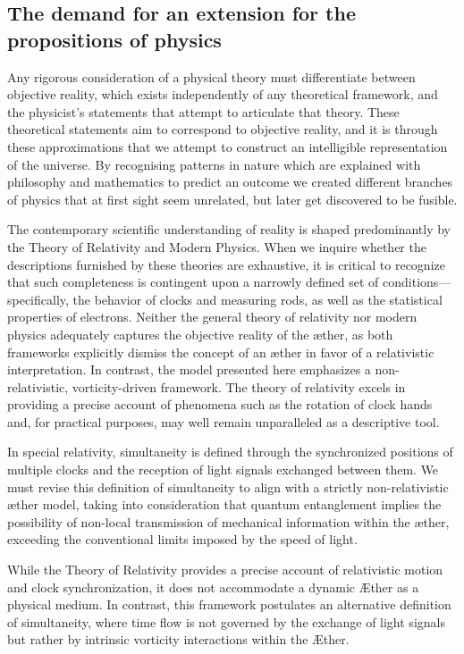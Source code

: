 \subsection{The demand for an extension for the propositions of physics}\label{subsec:introduction}

Any rigorous consideration of a physical theory must differentiate between objective reality, which exists independently of any theoretical framework, and the physicist's statements that attempt to articulate that theory.
These theoretical statements aim to correspond to objective reality, and it is through these approximations that we attempt to construct an intelligible representation of the universe.
By recognising patterns in nature which are explained with philosophy and mathematics to predict an outcome we created different branches of physics that at first sight seem unrelated, but later get discovered to be fusible.

The contemporary scientific understanding of reality is shaped predominantly by the Theory of Relativity and Modern Physics.
When we inquire whether the descriptions furnished by these theories are exhaustive, it is critical to recognize that such completeness is contingent upon a narrowly defined set of conditions—specifically, the behavior of clocks and measuring rods, as well as the statistical properties of electrons.
Neither the general theory of relativity nor modern physics adequately captures the objective reality of the \ae ther, as both frameworks explicitly dismiss the concept of an \ae ther in favor of a relativistic interpretation.
In contrast, the model presented here emphasizes a non-relativistic, vorticity-driven framework.
The theory of relativity excels in providing a precise account of phenomena such as the rotation of clock hands and, for practical purposes, may well remain unparalleled as a descriptive tool.

In special relativity, simultaneity is defined through the synchronized positions of multiple clocks and the reception of light signals exchanged between them.
We must revise this definition of simultaneity to align with a strictly non-relativistic \ae ther model, taking into consideration that quantum entanglement implies the possibility of non-local transmission of mechanical information within the \ae ther, exceeding the conventional limits imposed by the speed of light.

While the Theory of Relativity provides a precise account of relativistic motion and clock synchronization, it does not accommodate a dynamic \AE ther as a physical medium.
In contrast, this framework postulates an alternative definition of simultaneity, where time flow is not governed by the exchange of light signals but rather by intrinsic vorticity interactions within the \AE ther.


